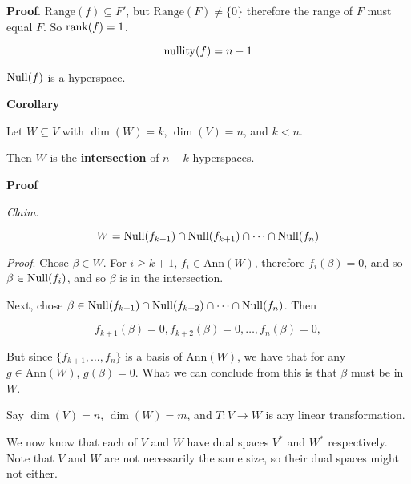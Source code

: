 \documentclass[12pt]{article}
\def\range{\text{Range}}
\def\Ann{\text{Ann}}
\begin{document}
  {\bf Proof}. $\range(f) \subseteq F'$, but $\range(F) \ne \{0\}$ therefore the
  range of $F$ must equal $F$. So $\mathrm{rank}(f) = 1$.

  \[
    \mathrm{nullity}(f) = n - 1
  \]


  $\mathrm{Null}(f)$ is a hyperspace.

  {\bf Corollary}

  Let $W \subseteq V$ with $\dim(W) = k$, $\dim(V) = n$, and $k < n$.

  Then $W$ is the {\bf intersection} of $n - k$ hyperspaces.


  {\bf Proof}

  {\it Claim}.

  \[
    W = \mathrm{Null}(f_{k + 1}) \cap \mathrm{Null}(f_{k + 1}) \cap \cdots \cap \mathrm{Null}(f_{n})
  \]


  {\it Proof}. Chose $\beta \in W$. For $i \ge k + 1$, $f_i \in \Ann(W)$,
  therefore $f_i (\beta) = 0$, and so $\beta \in \mathrm{Null}(f_i)$, and so $\beta$ is
  in the intersection.

  Next, chose $\beta \in \mathrm{Null}(f_{k + 1}) \cap \mathrm{Null}(f_{k + 2}) \cap \cdots \cap
  \mathrm{Null}(f_{n})$. Then

  \[
    f_{k + 1}(\beta) = 0, f_{k + 2}(\beta) = 0, \dots, f_{n}(\beta) = 0, 
  \]

  But since $\{f_{k + 1}, \dots, f_n\}$ is a basis of $\Ann(W)$, we have that for
  any $g \in \Ann(W)$, $g(\beta) = 0$. What we can conclude from this is that
  $\beta$ must be in $W$.


  Say $\dim(V) = n$, $\dim(W) = m$, and $T: V \to W$ is any linear
  transformation.

  We now know that each of $V$ and $W$ have dual spaces $V^*$ and $W^*$
  respectively. Note that $V$ and $W$ are not necessarily the same size, so
  their dual spaces might not either.

\end{document}
